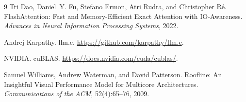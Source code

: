 \documentclass[11pt]{article}
\begin{document}
\begin{thebibliography}{9}
Tri Dao, Daniel~Y. Fu, Stefano Ermon, Atri Rudra, and Christopher R\'e.
FlashAttention: Fast and Memory-Efficient Exact Attention with IO-Awareness.
\emph{Advances in Neural Information Processing Systems}, 2022.

Andrej Karpathy.
llm.c.
\url{https://github.com/karpathy/llm.c}.

NVIDIA.
cuBLAS.
\url{https://docs.nvidia.com/cuda/cublas/}.

Samuel Williams, Andrew Waterman, and David Patterson.
Roofline: An Insightful Visual Performance Model for Multicore Architectures.
\emph{Communications of the ACM}, 52(4):65--76, 2009.
\end{thebibliography}
\end{document}
